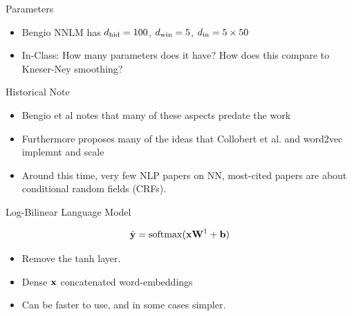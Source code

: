 \documentclass{beamer}
\begin{document}
\begin{frame}{Parameters}
  \begin{itemize}
  \item Bengio NNLM has ${d_{\mathrm{hid}}}=100$, ${d_{\mathrm{win}}}=5$, ${d_{\mathrm{in}}} = 5 \times 50 $ 
    \air 
    
  \item In-Class: How many parameters does it have? How does this compare to Kneser-Ney smoothing?
  \end{itemize}
\end{frame}

\begin{frame}{Historical Note}
  \begin{itemize}
  \item Bengio et al notes that many of these aspects predate the work
    \air 
  \item Furthermore proposes many of the ideas that Collobert et al. and word2vec implemnt and scale 
    \air 
  \item Around this time, very few NLP papers on  NN, most-cited papers are about conditional random fields (CRFs). 
  \end{itemize}
\end{frame}


\begin{frame}{Log-Bilinear Language Model }

  \[\hat{\boldy} = \softmax(\boldx\boldW^1 + \boldb)\]

  \begin{itemize}
  \item Remove the tanh layer.
    \air 

  \item Dense $\mathbf{x}$ concatenated word-embeddings

    \air 

  \item Can be faster to use, and in some cases simpler.
  \end{itemize}
\end{frame}
\end{document}
